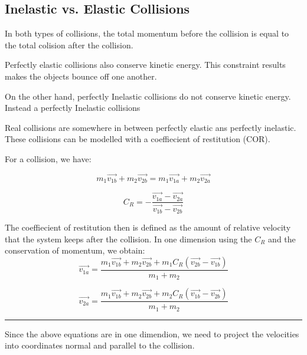 \documentclass{article}
\begin{document}
\subsection*{Inelastic vs. Elastic Collisions}

In both types of collisions, the total momentum before the collision is equal to the total colision after the collision.

Perfectly elastic collisions also conserve kinetic energy. This constraint results makes the objects bounce off one another.

On the other hand, perfectly Inelastic collisions do not conserve kinetic energy. Instead a perfectly Inelastic collisions 


Real collisions are somewhere in between perfectly elastic ans perfectly inelastic.
These collisions can be modelled with a coeffiecient of restitution (COR).

For a collision, we have:

\begin{equation}
    m_{1}\overrightarrow{v_{1b}} + m_{2}\overrightarrow{v_{2b}} = m_{1}\overrightarrow{v_{1a}} + m_{2}\overrightarrow{v_{2a}}
\end{equation}

\begin{equation}
    C_{R} =  -\frac{\overrightarrow{v_{1a}} - \overrightarrow{v_{2a}}}{\overrightarrow{v_{1b}} - \overrightarrow{v_{2b}}}
\end{equation}

The coeffiecient of restitution then is defined as the amount of relative velocity that the system keeps after the collision.
In one dimension using the $C_R$ and the conservation of momentum, we obtain:
\begin{equation}
    \overrightarrow{v_{1a}} =  \frac{m_1\overrightarrow{v_{1b}} + m_2\overrightarrow{v_{2b}} + m_1C_R(\overrightarrow{v_{2b}} - \overrightarrow{v_{1b}})}{m_1 + m_2}
\end{equation}

\begin{equation}
    \overrightarrow{v_{2a}} =  \frac{m_1\overrightarrow{v_{1b}} + m_2\overrightarrow{v_{2b}} + m_2C_R(\overrightarrow{v_{1b}} - \overrightarrow{v_{2b}})}{m_1 + m_2}
\end{equation}

\vspace{5pt}
\hrule
\vspace{5pt}

Since the above equations are in one dimendion, we need to project the velocities into coordinates normal and parallel to the collision.
\end{document}
